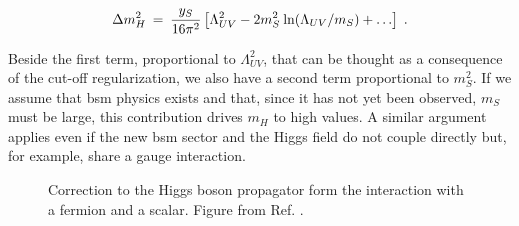 \begin{equation}
\Delta m_H^2 \>=\> {y_S\over 16 \pi^2}
\left [\Lambda_{UV}^2 - 2 m_S^2
\> {\rm ln}(\Lambda_{UV}/m_S) + \ldots
\right ] \; .
\label{eq:divhs}
\end{equation}

\noindent Beside the first term, proportional to $\Lambda_{UV}^2$, that can be thought as a consequence of the cut-off regularization, we also have a second  term proportional to $m_S^2$. If we assume that \gls{bsm} physics exists and that, since it has not yet been observed, $m_S$ must be large, this contribution drives $m_H$ to high values. A similar argument applies even if the new \gls{bsm} sector and the Higgs field do not couple directly but, for example, share a gauge interaction.

\begin{figure}[ht]
\centering
{}
\caption{Correction to the Higgs boson propagator form the interaction with  a fermion and  a scalar. Figure from Ref. \cite{Martin:1997ns}.}
\label{fig:sm:h_corr}
\end{figure}

